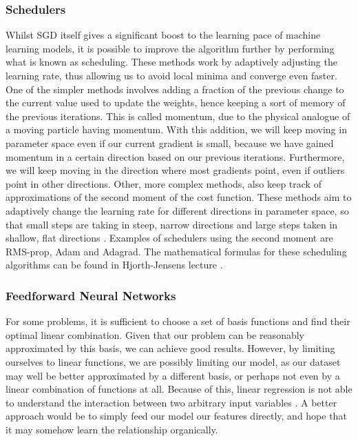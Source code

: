 \documentclass[onecolumn,10pt,cleanfoot]{asme2ej}
\begin{document}
\subsubsection{Schedulers}

Whilst SGD itself gives a significant boost to the learning pace of machine learning models, it is possible to improve the algorithm further by performing what is known as scheduling. These methods work by adaptively adjusting the learning rate, thus allowing us to avoid local minima and converge even faster. One of the simpler methods involves adding a fraction of the previous change to the current value used to update the weights, hence keeping a sort of memory of the previous iterations. This is called momentum, due to the physical analogue of a moving particle having momentum. With this addition, we will keep moving in parameter space even if our current gradient is small, because we have gained momentum in a certain direction based on our previous iterations. Furthermore, we will keep moving in the direction where most gradients point, even if outliers point in other directions. Other, more complex methods, also keep track of approximations of the second moment of the cost function. These methods aim to adaptively change the learning rate for different directions in parameter space, so that small steps are taking in steep, narrow directions and large steps taken in shallow, flat directions \cite{mortensched}. Examples of schedulers using the second moment are RMS-prop, Adam and Adagrad. The mathematical formulas for these scheduling algorithms can be found in Hjorth-Jensens lecture \cite{mortensched}.

\subsubsection{Feedforward Neural Networks}

For some problems, it is sufficient to choose a set of basis functions and find their optimal linear combination. Given that our problem can be reasonably approximated by this basis, we can achieve good results. However, by limiting ourselves to linear functions, we are possibly limiting our model, as our dataset may well be better approximated by a different basis, or perhaps not even by a linear combination of functions at all. Because of this, linear regression is not able to understand the interaction between two arbitrary input variables \cite[165]{gbc}. A better approach would be to simply feed our model our features directly, and hope that it may somehow learn the relationship organically.
\end{document}
